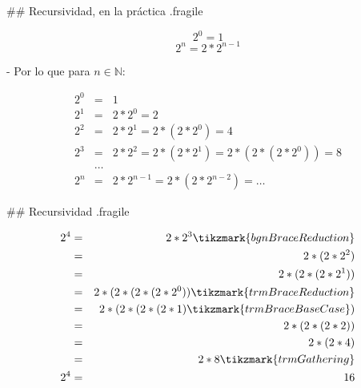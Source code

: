 
## Recursividad, en la práctica {.fragile}


$$ 2^0 = 1 $$
$$ 2^n = 2 * 2^{n-1} $$

- Por lo que para $n \in \mathbb{N}$:

\begin{eqnarray*}
2^0 & = & 1 \\
2^1 & = & 2 * 2^0 = 2 \\
2^2 & = & 2 * 2^1 = 2 * (2 * 2^0) = 4 \\
2^3 & = & 2 * 2^2 = 2 * (2 * 2^1) = 2 * (2 * (2 * 2^0)) = 8\\
    & \ldots & \\
2^n & = & 2 * 2^{n-1} = 2 * (2 * 2^{n-2}) = \ldots
\end{eqnarray*}


## Recursividad {.fragile}


\vspace{-3ex}

\bgncolumns


\begin{eqnarray*}
2^4 & = & 2 * 2^3 \tikzmark{bgnBraceReduction} \\
    & = & 2 * (2 * 2^2) \\
    & = & 2 * (2 * (2 * 2^1)) \\
    & = & 2 * (2 * (2 * (2 * 2^0)) \tikzmark{trmBraceReduction} \\
    & = & 2 * (2 * (2 * (2 * 1) \tikzmark{trmBraceBaseCase}) \\
    & = & 2 * (2 * (2 * 2)) \\
    & = & 2 * (2 * 4) \\
    & = & 2 * 8 \tikzmark{trmGathering} \\
2^4 & = & 16 \\
\end{eqnarray*}


